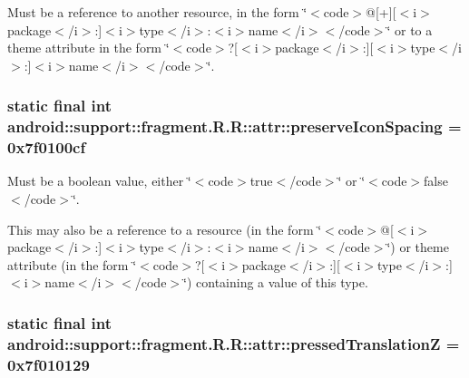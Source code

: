 Must be a reference to another resource, in the form \char`\"{}$<$code$>$@\mbox{[}+\mbox{]}\mbox{[}$<$i$>$package$<$/i$>$:\mbox{]}$<$i$>$type$<$/i$>$:$<$i$>$name$<$/i$>$$<$/code$>$\char`\"{} or to a theme attribute in the form \char`\"{}$<$code$>$?\mbox{[}$<$i$>$package$<$/i$>$:\mbox{]}\mbox{[}$<$i$>$type$<$/i$>$:\mbox{]}$<$i$>$name$<$/i$>$$<$/code$>$\char`\"{}. \hypertarget{classandroid_1_1support_1_1fragment_1_1_r_1_1attr_bb569251db8d434f79221e7caa916ceb}{
\subsubsection[{preserveIconSpacing}]{\setlength{\rightskip}{0pt plus 5cm}static final int android::support::fragment.R.R::attr::preserveIconSpacing = 0x7f0100cf}}
\label{classandroid_1_1support_1_1fragment_1_1_r_1_1attr_bb569251db8d434f79221e7caa916ceb}


Must be a boolean value, either \char`\"{}$<$code$>$true$<$/code$>$\char`\"{} or \char`\"{}$<$code$>$false$<$/code$>$\char`\"{}. 

This may also be a reference to a resource (in the form \char`\"{}$<$code$>$@\mbox{[}$<$i$>$package$<$/i$>$:\mbox{]}$<$i$>$type$<$/i$>$:$<$i$>$name$<$/i$>$$<$/code$>$\char`\"{}) or theme attribute (in the form \char`\"{}$<$code$>$?\mbox{[}$<$i$>$package$<$/i$>$:\mbox{]}\mbox{[}$<$i$>$type$<$/i$>$:\mbox{]}$<$i$>$name$<$/i$>$$<$/code$>$\char`\"{}) containing a value of this type. \hypertarget{classandroid_1_1support_1_1fragment_1_1_r_1_1attr_52265ef1fe322a164c87295d3f8d63d5}{
\subsubsection[{pressedTranslationZ}]{\setlength{\rightskip}{0pt plus 5cm}static final int android::support::fragment.R.R::attr::pressedTranslationZ = 0x7f010129}}
\label{classandroid_1_1support_1_1fragment_1_1_r_1_1attr_52265ef1fe322a164c87295d3f8d63d5}


